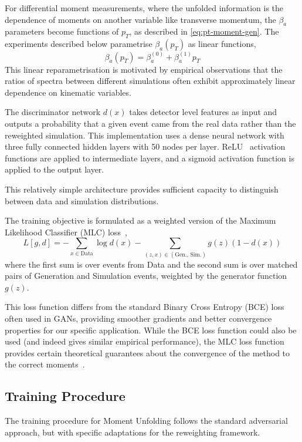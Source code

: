     For differential moment measurements, where the unfolded information is the dependence of moments on another variable like transverse momentum, the $\beta_a$ parameters become functions of $p_T$, as described in \cref{eq:pt-moment-gen}.
    The experiments described below parametrise $\beta_a(p_T)$ as linear functions, 
    \[
        \beta_a(p_T) = \beta_a^{(0)} + \beta_a^{(1)}p_T
    \]
    This linear reparametrisation is motivated by empirical observations that the ratios of spectra between different simulations often exhibit approximately linear dependence on kinematic variables.

    The discriminator network $d(x)$ takes detector level features as input and outputs a probability that a given event came from the real data rather than the reweighted simulation.
    This implementation uses a dense neural network with three fully connected hidden layers with 50 nodes per layer.
    ReLU~\cite{Householder1941ALemmas} activation functions are applied to intermediate layers, and a sigmoid activation function is applied to the output layer.

    This relatively simple architecture provides sufficient capacity to distinguish between data and simulation distributions.

    The training objective is formulated as a weighted version of the Maximum Likelihood Classifier (MLC) loss~\cite{Stoye2018Likelihood-freeEstimator},
    \[
        L[g,d] = -\sum_{x \in \text{Data}} \log d(x) - \sum_{(z,x) \in (\text{Gen., Sim.})} g(z)(1-d(x))
    \]
    where the first sum is over events from Data and the second sum is over matched pairs of Generation and Simulation events, weighted by the generator function $g(z)$.

    This loss function differs from the standard Binary Cross Entropy (BCE) loss often used in GANs, providing smoother gradients and better convergence properties for our specific application.
    While the BCE loss function could also be used (and indeed gives similar empirical performance), the MLC loss function provides certain theoretical guarantees about the convergence of the method to the correct moments~\cite{desai2024moment}.
    \subsection{Training Procedure}
        The training procedure for Moment Unfolding follows the standard adversarial approach, but with specific adaptations for the reweighting framework.
        
